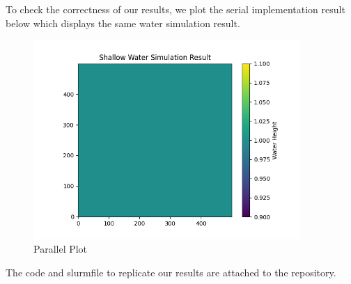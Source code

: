 \documentclass[a4paper,10pt]{article}
\begin{document}
To check the correctness of our results, we plot the serial implementation result below which displays the same water simulation result.

\begin{figure}[H]
  \centering
  \includegraphics[width=0.9\textwidth]{img/ex5/serial_plot.png}
  \caption{Parallel Plot}
  \label{fig:ex5_serial}
\end{figure}


The code and slurmfile to replicate our results are attached to the repository.

\end{document}
